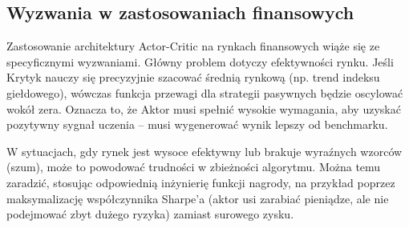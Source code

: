 \subsection{Wyzwania w zastosowaniach finansowych}

Zastosowanie architektury Actor-Critic na rynkach finansowych wiąże się ze specyficznymi wyzwaniami. Główny problem dotyczy efektywności rynku. Jeśli Krytyk nauczy się precyzyjnie szacować średnią rynkową (np. trend indeksu giełdowego), wówczas funkcja przewagi dla strategii pasywnych będzie oscylować wokół zera. Oznacza to, że Aktor musi spełnić wysokie wymagania, aby uzyskać pozytywny sygnał uczenia – musi wygenerować wynik lepszy od benchmarku. 

W sytuacjach, gdy rynek jest wysoce efektywny lub brakuje wyraźnych wzorców (szum), może to powodować trudności w zbieżności algorytmu. Można temu zaradzić, stosując odpowiednią inżynierię funkcji nagrody, na przykład poprzez maksymalizację współczynnika Sharpe'a (aktor usi zarabiać pieniądze, ale nie podejmować zbyt dużego ryzyka) zamiast surowego zysku.